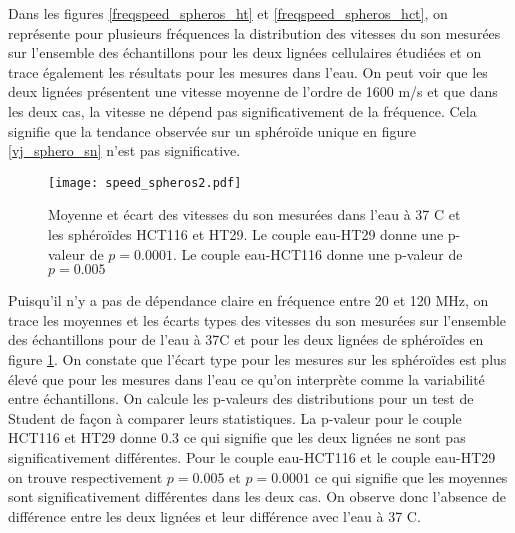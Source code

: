 Dans les figures \ref{freqspeed_spheros_ht} et \ref{freqspeed_spheros_hct}, on représente pour plusieurs fréquences  la distribution des vitesses du son mesurées sur l'ensemble des échantillons pour les deux lignées cellulaires étudiées et on trace également les résultats pour les mesures dans l'eau. On peut voir que les deux lignées présentent une vitesse moyenne de l'ordre de 1600 m/s et que dans les deux cas, la vitesse ne dépend pas significativement de la fréquence. Cela signifie que la tendance observée sur un sphéroïde unique en figure \ref{vj_sphero_sn} n'est pas significative. 
\begin{figure}[tb!]
\centering
\texttt{[image: speed\_spheros2.pdf]}
\caption{Moyenne et écart des vitesses du son mesurées dans l'eau à 37 \textdegree C et les sphéroïdes HCT116 et HT29. Le couple eau-HT29 donne une p-valeur de $p=0.0001$.  Le couple eau-HCT116 donne une p-valeur de $p=0.005$\label{speed_spheros}}
\end{figure}
Puisqu'il n'y a pas de dépendance claire en fréquence entre 20 et 120 MHz, on trace les moyennes et les écarts types des vitesses du son mesurées sur l'ensemble des échantillons pour de l'eau à 37\textdegree C et pour les deux lignées de sphéroïdes en figure \ref{speed_spheros}. On constate que l'écart type pour les mesures sur les sphéroïdes est plus élevé que pour les mesures dans l'eau ce qu'on interprète comme la variabilité entre échantillons. On calcule les p-valeurs des distributions pour un test de Student de façon à comparer leurs statistiques. La p-valeur pour le couple HCT116 et HT29 donne 0.3 ce qui signifie que les deux lignées ne sont pas significativement différentes. Pour le couple eau-HCT116 et le couple  eau-HT29  on trouve respectivement $p = 0.005$ et $p = 0.0001$ ce qui signifie que les moyennes sont significativement différentes dans les deux cas. On observe donc l'absence de différence entre les  deux lignées et leur différence avec l'eau à 37 \textdegree C. 



